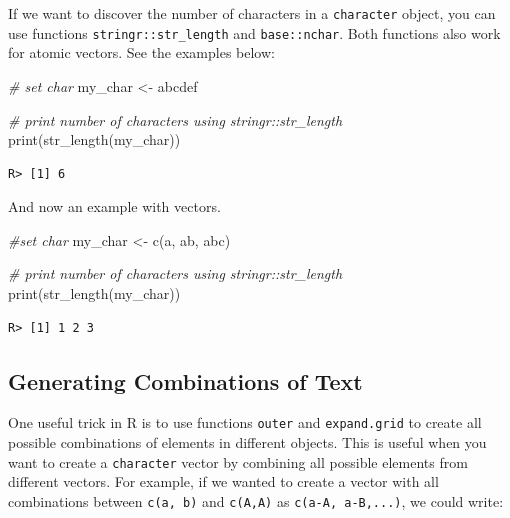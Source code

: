 \documentclass[
  12pt,
]{book}
\newenvironment{Shaded}{\begin{snugshade}}{\end{snugshade}}
\newcommand{\CommentTok}[1]{\textcolor[rgb]{0.37,0.37,0.37}{\textit{#1}}}
\newcommand{\FunctionTok}[1]{\textcolor[rgb]{0,0,0}{#1}}
\newcommand{\NormalTok}[1]{#1}
\newcommand{\OtherTok}[1]{\textcolor[rgb]{0.37,0.37,0.37}{#1}}
\newcommand{\StringTok}[1]{\textcolor[rgb]{0.5,0.5,0.5}{#1}}
\begin{document}
If we want to discover the number of characters in a \texttt{character} object, you can use functions \texttt{stringr::str\_length} and \texttt{base::nchar}. Both functions also work for atomic vectors. See the examples below:  

\begin{Shaded}
\begin{Highlighting}[]
\CommentTok{\# set char}
\NormalTok{my\_char }\OtherTok{\textless{}{-}} \StringTok{\textquotesingle{}abcdef\textquotesingle{}}

\CommentTok{\# print number of characters using stringr::str\_length}
\FunctionTok{print}\NormalTok{(}\FunctionTok{str\_length}\NormalTok{(my\_char))}
\end{Highlighting}
\end{Shaded}

\begin{verbatim}
R> [1] 6
\end{verbatim}

And now an example with vectors.

\begin{Shaded}
\begin{Highlighting}[]
\CommentTok{\#set char}
\NormalTok{my\_char }\OtherTok{\textless{}{-}} \FunctionTok{c}\NormalTok{(}\StringTok{\textquotesingle{}a\textquotesingle{}}\NormalTok{, }\StringTok{\textquotesingle{}ab\textquotesingle{}}\NormalTok{, }\StringTok{\textquotesingle{}abc\textquotesingle{}}\NormalTok{)}

\CommentTok{\# print number of characters using stringr::str\_length}
\FunctionTok{print}\NormalTok{(}\FunctionTok{str\_length}\NormalTok{(my\_char))}
\end{Highlighting}
\end{Shaded}

\begin{verbatim}
R> [1] 1 2 3
\end{verbatim}

\hypertarget{generating-combinations-of-text}{%
\subsection{Generating Combinations of Text}\label{generating-combinations-of-text}}

One useful trick in R is to use functions \texttt{outer} and \texttt{expand.grid} to create all possible combinations of elements in different objects. This is useful when you want to create a \texttt{character} vector by combining all possible elements from different vectors. For example, if we wanted to create a vector with all combinations between \texttt{c(\textquotesingle{}a\textquotesingle{},\ \textquotesingle{}b\textquotesingle{})} and \texttt{\textquotesingle{}c(\textquotesingle{}A\textquotesingle{},\textquotesingle{}A\textquotesingle{})} as \texttt{c(\textquotesingle{}a-A\textquotesingle{},\ \textquotesingle{}a-B\textquotesingle{},...)}, we could write:
\end{document}
